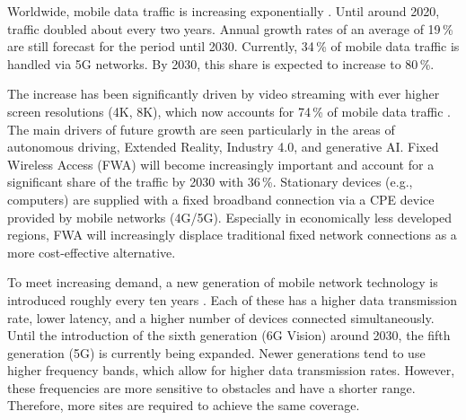 \begin{English}
    Worldwide, mobile data traffic is increasing exponentially \cite{EricssonMobilityReport}. Until around 2020, traffic doubled about every two years. Annual growth rates of an average of 19\,\% are still forecast for the period until 2030. Currently, 34\,\% of mobile data traffic is handled via 5G networks. By 2030, this share is expected to increase to 80\,\%.

    The increase has been significantly driven by video streaming with ever higher screen resolutions (4K, 8K), which now accounts for 74\,\% of mobile data traffic \cite{EricssonMobilityReport}. The main drivers of future growth are seen particularly in the areas of autonomous driving, Extended Reality, Industry 4.0, and generative AI. 
    Fixed Wireless Access (FWA) will become increasingly important and account for a significant share of the traffic by 2030 with 36\,\%. Stationary devices (e.g., computers) are supplied with a fixed broadband connection via a CPE device provided by mobile networks (4G/5G). Especially in economically less developed regions, FWA will increasingly displace traditional fixed network connections as a more cost-effective alternative. \cite{EricssonMobilityReport}

    To meet increasing demand, a new generation of mobile network technology is introduced roughly every ten years \cite{bundesratNachhaltigesMobilfunknetzBericht2022}. Each of these has a higher data transmission rate, lower latency, and a higher number of devices connected simultaneously. Until the introduction of the sixth generation (6G Vision) around 2030, the fifth generation (5G) is currently being expanded. Newer generations tend to use higher frequency bands, which allow for higher data transmission rates. However, these frequencies are more sensitive to obstacles and have a shorter range. Therefore, more sites are required to achieve the same coverage. \cite{bundesratNachhaltigesMobilfunknetzBericht2022} 
\end{English}

